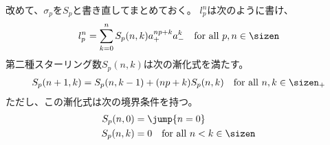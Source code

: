	改めて、$\sigma_p$を$S_p$と書き直してまとめておく。
	$l_p^n$は次のように書け、
	\begin{equation*}\begin{split} %
		l_p^n = \sum_{k=0}^nS_p(n,k)a_+^{np+k}a_-^k
		\quad\text{for all }p,n\in\sizen
	\end{split}\end{equation*} %
	第二種スターリング数$S_p(n,k)$は次の漸化式を満たす。
	\begin{equation*}\begin{split} %
		S_p(n+1,k) = S_p(n,k-1) + (np+k)S_p(n,k)
		\quad\text{for all }n,k\in\sizen_+
	\end{split}\end{equation*} %
	ただし、この漸化式は次の境界条件を持つ。
	\begin{equation*}\begin{split} %
		S_p(n,0) &= \jump{n=0} \\
		S_p(n,k) &= 0 \quad\text{for all }n<k\in\sizen
	\end{split}\end{equation*} %

	\begin{todo}[ここまで]\label{todo:ここまで} %
	\end{todo} %

